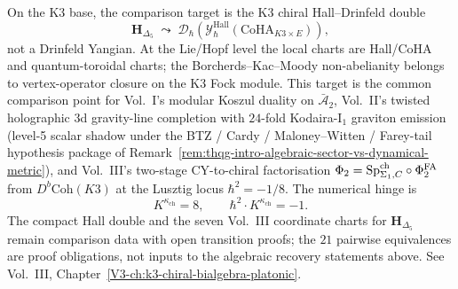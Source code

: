\begin{remark}
\label{rem:thqg-intro-suppl-1}
On the K3 base, the comparison target is the K3 chiral
Hall--Drinfeld double
\[
\mathbf H_{\Delta_5}
\;\leadsto\;
\mathcal D_\hbar\!\left(
 \mathcal Y^{\mathrm{Hall}}_\hbar(\mathrm{CoHA}_{K3\times E})
\right),
\]
not a Drinfeld Yangian. At the Lie/Hopf level the local charts are
Hall/CoHA and quantum-toroidal charts; the Borcherds--Kac--Moody
non-abelianity belongs to vertex-operator closure on the K3 Fock
module. This target is the common comparison point for Vol.~I's modular
Koszul duality on $\bar{\mathcal A}_2$, Vol.~II's twisted holographic
3d gravity-line completion with $24$-fold Kodaira-I$_1$ graviton
emission (level-5 scalar shadow under the BTZ / Cardy /
Maloney--Witten / Farey-tail hypothesis package of
Remark~\ref{rem:thqg-intro-algebraic-sector-vs-dynamical-metric}), and
Vol.~III's two-stage CY-to-chiral factorisation
$\Phi_2 = \mathrm{Sp}^{\mathrm{ch}}_{\Sigma_1, C} \circ \Phi^{\mathrm{FA}}_2$ from
$D^b\mathrm{Coh}(K3)$ at the Lusztig locus
$\hbar^2 = -1/8$. The numerical hinge is
\[
K^{\kappa_{\mathrm{ch}}}=8,\qquad
\hbar^2\cdot K^{\kappa_{\mathrm{ch}}}=-1.
\]
The compact Hall double and the seven Vol.~III coordinate charts for
$\mathbf H_{\Delta_5}$ remain comparison data with open transition
proofs; the $21$ pairwise equivalences are proof obligations, not
inputs to the algebraic recovery statements above. See Vol.~III,
Chapter~\ref{V3-ch:k3-chiral-bialgebra-platonic}.
\end{remark}
